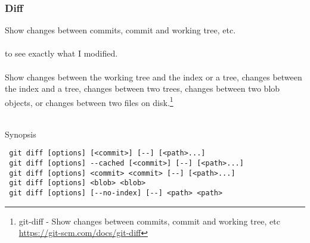 
\subsubsection{Diff}
Show changes between commits, commit and working tree, etc.
\\
\\
 to see exactly what I modified.
\\
\\
Show changes between the working tree and the index or a tree,
changes between the index and a tree, changes between two trees,
changes between two blob objects, or changes between two files on
disk.\footnote{git-diff - Show changes between commits, commit and working tree, etc\\
\href{https://git-scm.com/docs/git-diff}{https://git-scm.com/docs/git-diff}}
\\
\\
\begin{bf}Synopsis\end{bf}
\begin{verbatim}
 git diff [options] [<commit>] [--] [<path>...]
 git diff [options] --cached [<commit>] [--] [<path>...]
 git diff [options] <commit> <commit> [--] [<path>...]
 git diff [options] <blob> <blob>
 git diff [options] [--no-index] [--] <path> <path>
\end{verbatim}
